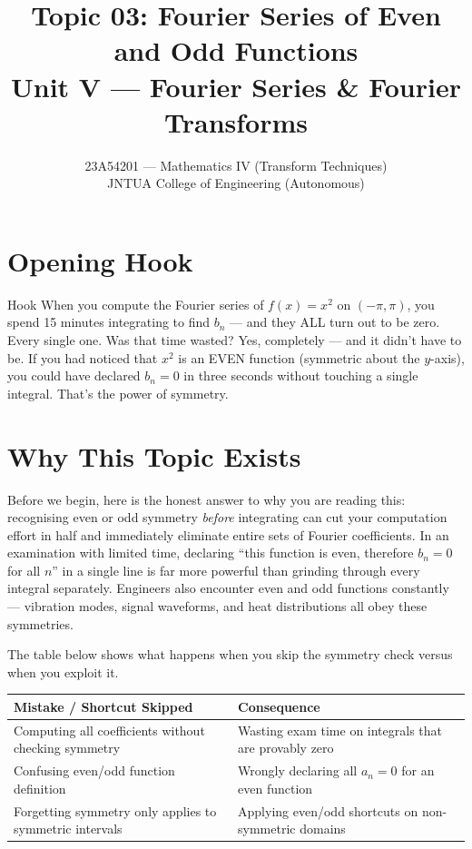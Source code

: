 \documentclass[12pt,a4paper]{article}
\title{Topic 03: Fourier Series of Even and Odd Functions \\
       \large Unit V --- Fourier Series \& Fourier Transforms}
\author{23A54201 --- Mathematics IV (Transform Techniques) \\
        JNTUA College of Engineering (Autonomous)}
\date{}
\begin{document}

\maketitle
\tableofcontents
\newpage

\section{Opening Hook}

\begin{curiositybox}{Hook}
When you compute the Fourier series of $f(x)=x^2$ on $(-\pi,\pi)$, you spend 15 minutes
integrating to find $b_n$ --- and they ALL turn out to be zero. Every single one. Was that
time wasted? Yes, completely --- and it didn't have to be. If you had noticed that $x^2$ is
an EVEN function (symmetric about the $y$-axis), you could have declared $b_n=0$ in three
seconds without touching a single integral. That's the power of symmetry.
\end{curiositybox}

\section{Why This Topic Exists}

Before we begin, here is the honest answer to why you are reading this: recognising even or
odd symmetry \emph{before} integrating can cut your computation effort in half and immediately
eliminate entire sets of Fourier coefficients. In an examination with limited time, declaring
``this function is even, therefore $b_n = 0$ for all $n$'' in a single line is far more
powerful than grinding through every integral separately. Engineers also encounter even and odd
functions constantly --- vibration modes, signal waveforms, and heat distributions all obey
these symmetries.

\medskip

The table below shows what happens when you skip the symmetry check versus when you exploit it.

\begin{center}
\begin{tabular}{@{}ll@{}}
\toprule
\textbf{Mistake / Shortcut Skipped} & \textbf{Consequence} \\
\midrule
Computing all coefficients without checking symmetry &
    Wasting exam time on integrals that are provably zero \\
Confusing even/odd function definition &
    Wrongly declaring all $a_n = 0$ for an even function \\
Forgetting symmetry only applies to symmetric intervals &
    Applying even/odd shortcuts on non-symmetric domains \\
\bottomrule
\end{tabular}
\end{center}
\end{document}
